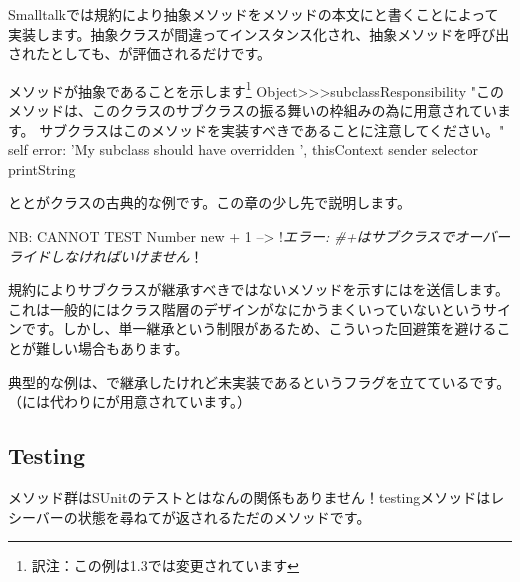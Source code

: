 \documentclass[a4paper,10pt,twoside]{book}
\begin{document}
Smalltalkでは規約により抽象メソッドをメソッドの本文にと書くことによって実装します。抽象クラスが間違ってインスタンス化され、抽象メソッドを呼び出されたとしても、が評価されるだけです。

\begin{method}{メソッドが抽象であることを示します\footnote{訳注：この例は\pharo 1.3では変更されています}}
Object>>>subclassResponsibility
    "このメソッドは、このクラスのサブクラスの振る舞いの枠組みの為に用意されています。
    サブクラスはこのメソッドを実装すべきであることに注意してください。"
    self error: 'My subclass should have overridden ', thisContext sender selector printString
\end{method}

ととがクラスの古典的な例です。この章の少し先で説明します。

\begin{code}{NB: CANNOT TEST}
Number new + 1 --> !\emph{エラー: \#+はサブクラスでオーバーライドしなければいけません}！
\end{code}

規約によりサブクラスが継承すべきではないメソッドを示すにはを送信します。これは一般的にはクラス階層のデザインがなにかうまくいっていないというサインです。しかし、単一継承という制限があるため、こういった回避策を避けることが難しい場合もあります。

典型的な例は、で継承したけれど未実装であるというフラグを立てているです。（には代わりにが用意されています。）



\subsection{Testing}

メソッド群はSUnitのテストとはなんの関係もありません！testingメソッドはレシーバーの状態を尋ねてが返されるただのメソッドです。
\end{document}
